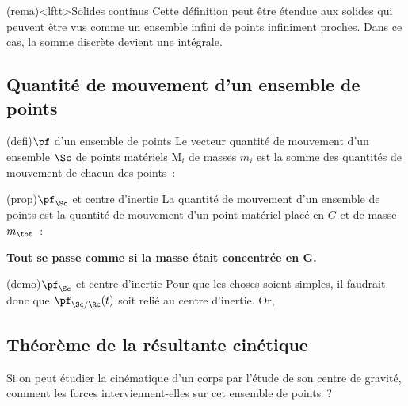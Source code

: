 \documentclass[../../main/main.tex]{subfiles}
\begin{document}
\begin{tcb}(rema)<lftt>{Solides continus}
	Cette définition peut être étendue aux solides qui peuvent être vus comme un
	ensemble infini de points infiniment proches. Dans ce cas, la somme discrète
	devient une intégrale.
\end{tcb}

\subsection{Quantité de mouvement d'un ensemble de points}


\begin{tcb*}(defi){$\protect\pf$ d'un ensemble de points}
	Le vecteur quantité de mouvement d'un ensemble $\Sc$ de points matériels
	M$_i$ de masses $m_i$ est la somme des quantités de mouvement de chacun des
	points~:
	\psw{%
		\[
			\boxed{\pf_{\Sc/\Rc}(t) = \sum_i m_i \vf_{\Mr_i/\Rc}(t)}
		\]
	}%
	\vspace{-15pt}
\end{tcb*}

\begin{tcb*}(prop){$\protect\pf_{\Sc}$ et centre d'inertie}
	La quantité de mouvement d'un ensemble de points est la quantité de
	mouvement d'un point matériel placé en $G$ et de masse $m_{\tot}$~:
	\psw{%
		\[
			\boxed{\pf_{\Sc/\Rc}(t) = m_{\tot}\vf_{\Gr/\Rc}(t)}
		\]
	}%
	\vspace{-25pt}
	\begin{center}
		\textbf{Tout se passe comme si la masse était concentrée en G.}
	\end{center}
\end{tcb*}

\begin{tcb*}(demo){$\protect\pf_{\Sc}$ et centre d'inertie}
	Pour que les choses soient simples, il faudrait donc que $\pf_{\Sc/\Rc}(t)$
	soit relié au centre d'inertie. Or,
	\psw{%
		\[
			\vf_{\Gr/\Rc}(t) = \dv{\vvr{OG}}{t} = \frac{1}{m_{\tot}}
			\underbracket[1pt]{\sum_i m_i \dv{{\OM}_i}{t}}_{\pf_{\Sc/\Rc}(t)}
			\Lra
			\boxed{\pf_{\Sc/\Rc}(t) = m_{\tot}\vf_{\Gr/\Rc}(t)}
		\]
	}%
	\vspace{-15pt}
\end{tcb*}

\subsection{Théorème de la résultante cinétique}
Si on peut étudier la cinématique d'un corps par l'étude de son centre de
gravité, comment les forces interviennent-elles sur cet ensemble de points~?
\end{document}
